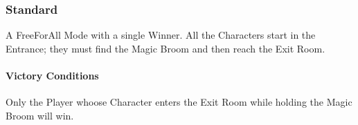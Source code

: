 \subsubsection{Standard} 
A Free\-For\-All Mode with a single Winner.
All the Characters start in the Entrance; they must find the Magic Broom and then reach the Exit Room.
\paragraph{Victory Conditions} Only the Player whoose Character enters the Exit Room while holding the Magic Broom will win.
